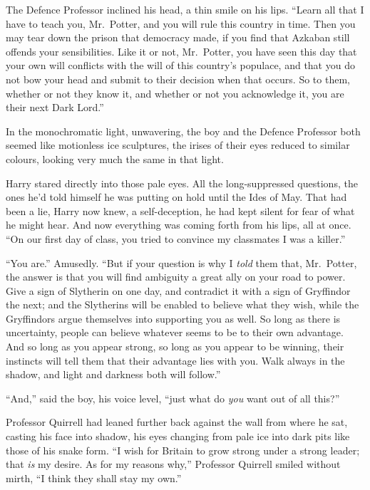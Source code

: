 The Defence Professor inclined his head, a thin smile on his lips.
``Learn all that I have to teach you, Mr.~Potter, and you will rule this
country in time. Then you may tear down the prison that democracy made,
if you find that Azkaban still offends your sensibilities. Like it or
not, Mr.~Potter, you have seen this day that your own will conflicts
with the will of this country's populace, and that you do not bow your
head and submit to their decision when that occurs. So to them, whether
or not they know it, and whether or not you acknowledge it, you are
their next Dark Lord.''

In the monochromatic light, unwavering, the boy and the Defence
Professor both seemed like motionless ice sculptures, the irises of
their eyes reduced to similar colours, looking very much the same in
that light.

Harry stared directly into those pale eyes. All the long-suppressed
questions, the ones he'd told himself he was putting on hold until the
Ides of May. That had been a lie, Harry now knew, a self-deception, he
had kept silent for fear of what he might hear. And now everything was
coming forth from his lips, all at once. ``On our first day of class,
you tried to convince my classmates I was a killer.''

``You are.'' Amusedly. ``But if your question is why I \emph{told} them
that, Mr.~Potter, the answer is that you will find ambiguity a great
ally on your road to power. Give a sign of Slytherin on one day, and
contradict it with a sign of Gryffindor the next; and the Slytherins
will be enabled to believe what they wish, while the Gryffindors argue
themselves into supporting you as well. So long as there is uncertainty,
people can believe whatever seems to be to their own advantage. And so
long as you appear strong, so long as you appear to be winning, their
instincts will tell them that their advantage lies with you. Walk always
in the shadow, and light and darkness both will follow.''

``And,'' said the boy, his voice level, ``just what do \emph{you} want
out of all this?''

Professor Quirrell had leaned further back against the wall from where
he sat, casting his face into shadow, his eyes changing from pale ice
into dark pits like those of his snake form. ``I wish for Britain to
grow strong under a strong leader; that \emph{is} my desire. As for my
reasons why,'' Professor Quirrell smiled without mirth, ``I think they
shall stay my own.''

